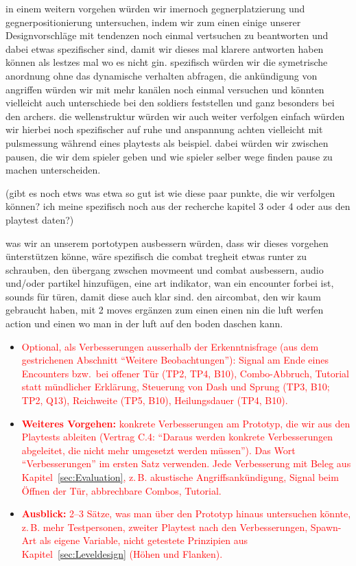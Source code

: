 \documentclass[../Main.tex]{subfiles}
\begin{document}
in einem weitern vorgehen würden wir imernoch gegnerplatzierung und gegnerpositionierung untersuchen, indem wir zum einen einige unserer Designvorschläge mit tendenzen noch einmal vertsuchen zu beantworten und dabei etwas spezifischer sind, damit wir dieses mal klarere antworten haben können als lestzes mal wo es nicht gin. spezifisch würden wir die symetrische anordnung ohne das dynamische verhalten abfragen, die ankündigung von angriffen würden wir mit mehr kanälen noch einmal versuchen und könnten vielleicht auch unterschiede bei den soldiers feststellen und ganz besonders bei den archers. die wellenstruktur würden wir auch weiter verfolgen einfach würden wir hierbei noch spezifischer auf ruhe und anspannung achten vielleicht mit pulsmessung während eines playtests als beispiel. dabei würden wir zwischen pausen, die wir dem spieler geben und wie spieler selber wege finden pause zu machen unterscheiden.

(gibt es noch etws was etwa so gut ist wie diese paar punkte, die wir verfolgen können? ich meine spezifisch noch aus der recherche kapitel 3 oder 4 oder aus den playtest daten?)

was wir an unserem portotypen ausbessern würden, dass wir dieses vorgehen ünterstützen könne, wäre spezifisch die combat tregheit etwas runter zu schrauben, den übergang zwschen movmeent und combat ausbessern, audio und/oder partikel hinzufügen, eine art indikator, wan ein encounter forbei ist, sounds für türen, damit diese auch klar sind. den aircombat, den wir kaum gebraucht haben, mit 2 moves ergänzen zum einen einen nin die luft werfen action und einen wo man in der luft auf den boden daschen kann.

\begin{itemize}[leftmargin=1.5cm]
    \item \textcolor{red}{Optional, als Verbesserungen ausserhalb der Erkenntnisfrage (aus dem gestrichenen Abschnitt \enquote{Weitere Beobachtungen}): Signal am Ende eines Encounters bzw.\ bei offener Tür (TP2, TP4, B10), Combo-Abbruch, Tutorial statt mündlicher Erklärung, Steuerung von Dash und Sprung (TP3, B10; TP2, Q13), Reichweite (TP5, B10), Heilungsdauer (TP4, B10).}
\end{itemize}

\begin{itemize}[leftmargin=1.5cm]
    \item \textcolor{red}{\textbf{Weiteres Vorgehen:} konkrete Verbesserungen am Prototyp, die wir aus den Playtests ableiten (Vertrag C.4: \enquote{Daraus werden konkrete Verbesserungen abgeleitet, die nicht mehr umgesetzt werden müssen}). Das Wort \enquote{Verbesserungen} im ersten Satz verwenden. Jede Verbesserung mit Beleg aus Kapitel~\ref{sec:Evaluation}, z.\,B. akustische Angriffsankündigung, Signal beim Öffnen der Tür, abbrechbare Combos, Tutorial.}
    \item \textcolor{red}{\textbf{Ausblick:} 2--3 Sätze, was man über den Prototyp hinaus untersuchen könnte, z.\,B. mehr Testpersonen, zweiter Playtest nach den Verbesserungen, Spawn-Art als eigene Variable, nicht getestete Prinzipien aus Kapitel~\ref{sec:Leveldesign} (Höhen und Flanken).}
\end{itemize}
\end{document}
